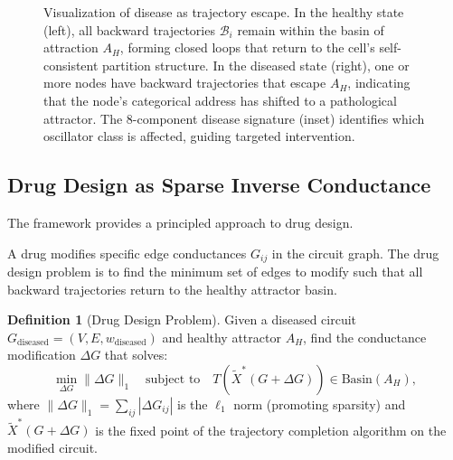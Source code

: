 \documentclass[twocolumn,10pt,a4paper]{article}
\theoremstyle{definition}
\newtheorem{definition}[theorem]{Definition}
\theoremstyle{remark}
\newcommand{\Back}{\mathcal{B}}
\begin{document}
\begin{figure}[t]
    \centering
    \caption{Visualization of disease as trajectory escape. In the healthy state (left), all backward trajectories $\Back_i$ remain within the basin of attraction $A_H$, forming closed loops that return to the cell's self-consistent partition structure. In the diseased state (right), one or more nodes have backward trajectories that escape $A_H$, indicating that the node's categorical address has shifted to a pathological attractor. The 8-component disease signature (inset) identifies which oscillator class is affected, guiding targeted intervention.}
    \label{fig:disease}
\end{figure}

\subsection{Drug Design as Sparse Inverse Conductance}

The framework provides a principled approach to drug design.

A drug modifies specific edge conductances $G_{ij}$ in the circuit graph. The drug design problem is to find the minimum set of edges to modify such that all backward trajectories return to the healthy attractor basin.

\begin{definition}[Drug Design Problem]
\label{def:drug_design}
Given a diseased circuit $G_{\mathrm{diseased}} = (V, E, w_{\mathrm{diseased}})$ and healthy attractor $A_H$, find the conductance modification $\Delta G$ that solves:
\begin{equation}
    \min_{\Delta G} \|\Delta G\|_1 \quad \text{subject to} \quad T(\tilde{X}^*(G + \Delta G)) \in \mathrm{Basin}(A_H),
    \label{eq:drug_design}
\end{equation}
where $\|\Delta G\|_1 = \sum_{ij} |\Delta G_{ij}|$ is the $\ell_1$ norm (promoting sparsity) and $\tilde{X}^*(G + \Delta G)$ is the fixed point of the trajectory completion algorithm on the modified circuit.
\end{definition}
\end{document}
